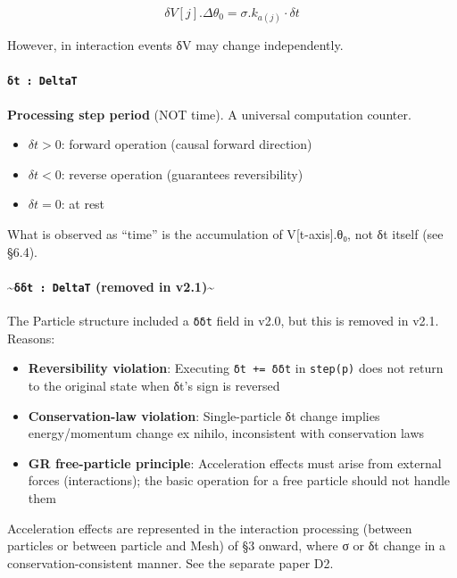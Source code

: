 \documentclass[a4paper,11pt]{article}
\providecommand{\tightlist}{\setlength{\itemsep}{0pt}\setlength{\parskip}{0pt}}
\begin{document}
\[\delta V[j].\Delta\theta_0 = \sigma.k_{a(j)} \cdot \delta t\]

However, in interaction events δV may change independently.

\paragraph{\texorpdfstring{\texttt{δt\ :\ DeltaT}}{δt : DeltaT}}\label{ux3b4t-deltat}

\textbf{Processing step period} (NOT time). A universal computation
counter.

\begin{itemize}
\tightlist
\item
  \(\delta t > 0\): forward operation (causal forward direction)
\item
  \(\delta t < 0\): reverse operation (guarantees reversibility)
\item
  \(\delta t = 0\): at rest
\end{itemize}

What is observed as ``time'' is the accumulation of V{[}t-axis{]}.θ₀,
not δt itself (see §6.4).

\paragraph{\texorpdfstring{\textasciitilde{}\texttt{δδt\ :\ DeltaT}
(removed in
v2.1)\textasciitilde{}}{\textasciitilde δδt : DeltaT (removed in v2.1)\textasciitilde{}}}\label{ux3b4ux3b4t-deltat-removed-in-v2.1}

The Particle structure included a \texttt{δδt} field in v2.0, but this
is removed in v2.1. Reasons:

\begin{itemize}
\tightlist
\item
  \textbf{Reversibility violation}: Executing \texttt{δt\ +=\ δδt} in
  \texttt{step(p)} does not return to the original state when δt's sign
  is reversed
\item
  \textbf{Conservation-law violation}: Single-particle δt change implies
  energy/momentum change ex nihilo, inconsistent with conservation laws
\item
  \textbf{GR free-particle principle}: Acceleration effects must arise
  from external forces (interactions); the basic operation for a free
  particle should not handle them
\end{itemize}

Acceleration effects are represented in the interaction processing
(between particles or between particle and Mesh) of §3 onward, where σ
or δt change in a conservation-consistent manner. See the separate paper
D2.
\end{document}
